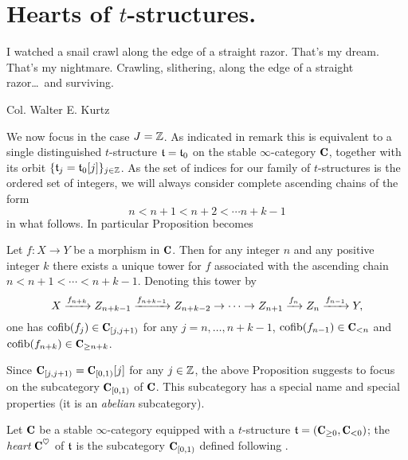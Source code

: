 \documentclass[a4paper,12pt]{amsart}
\begin{document}
\section{Hearts of $t$-structures.}
\setlength{\epigraphwidth}{.75\textwidth}
\epigraph{I watched a snail crawl along the edge of a straight razor. That's my dream. That's my nightmare. Crawling, slithering, along the edge of a straight razor\dots\ and surviving.
}{Col. Walter E. Kurtz}
\setlength{\epigraphwidth}{\DefaultEpigraphWidth}
We now focus in the case $J=\mathbb{Z} $. As indicated in remark  this is equivalent to a single distinguished $t$-structure $\mathfrak{t}=\mathfrak{t}_0$ on the stable $\infty$-category $\C$, together with its orbit $\{\mathfrak{t}_j = \mathfrak{t}_0[j]\}_{j\in\mathbb{Z}}$. As the set of indices for our family of $t$-structures is the ordered set of integers, we will always consider complete ascending chains of the form
\[
n<n+1<n+2<\cdots n+k-1
\]
in what follows. In particular Proposition  becomes
\begin{proposition}
Let $f\colon X\to Y$ be a morphism in $\C$. Then for any integer $n$ and any positive integer $k$ there exists a unique tower for $f$ associated with the ascending chain $n<n+1<\cdots<n+k-1$. Denoting this tower by
\[
X \xrightarrow{f_{n+k}} Z_{n+k-1} \xrightarrow{f_{n+k-1}}Z_{n+k-2}\to\dots\to Z_{n+1} \xrightarrow{f_{n}} Z_{n} \xrightarrow{f_{n-1}} Y,
\]
one has
$\cofib(f_j)\in \C_{[j,j+1)}$ for any $j=n,\dots,n+k-1$,  $\cofib(f_{n-1})\in \C_{<n}$  and $\cofib(f_{n+k})\in \C_{\geq n+k}$.
\end{proposition}
Since $\C_{[j,j+1)}=\C_{[0,1)}[j]$ for any $j\in\mathbb{Z}$, the above Proposition suggests to focus on the subcategory $\C_{[0,1)}$ of $\C$. This subcategory has a special name and special properties (it is an \emph{abelian} subcategory).
\begin{definition}\label{coeur}
Let $\C$ be a stable $\infty$-category equipped with a $t$-structure $\tee=(\C_{\ge 0}, \C_{<0})$; the \emph{heart} $\C^\heart$ of $\mathfrak{t}$ is the subcategory $\C_{[0,1)}$ defined following \adef {}.
\end{definition}
\end{document}
